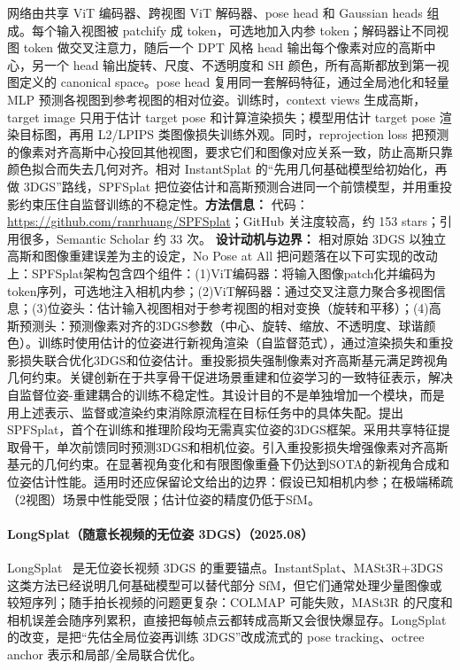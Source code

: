 网络由共享 ViT 编码器、跨视图 ViT 解码器、pose head 和 Gaussian heads 组成。每个输入视图被 patchify 成 token，可选地加入内参 token；解码器让不同视图 token 做交叉注意力，随后一个 DPT 风格 head 输出每个像素对应的高斯中心，另一个 head 输出旋转、尺度、不透明度和 SH 颜色，所有高斯都放到第一视图定义的 canonical space。pose head 复用同一套解码特征，通过全局池化和轻量 MLP 预测各视图到参考视图的相对位姿。训练时，context views 生成高斯，target image 只用于估计 target pose 和计算渲染损失；模型用估计 target pose 渲染目标图，再用 L2/LPIPS 类图像损失训练外观。同时，reprojection loss 把预测的像素对齐高斯中心投回其他视图，要求它们和图像对应关系一致，防止高斯只靠颜色拟合而失去几何对齐。相对 InstantSplat 的“先用几何基础模型给初始化，再做 3DGS”路线，SPFSplat 把位姿估计和高斯预测合进同一个前馈模型，并用重投影约束压住自监督训练的不稳定性。\textbf{方法信息：} 代码：\url{https://github.com/ranrhuang/SPFSplat}；GitHub 关注度较高，约 153 stars；引用很多，Semantic Scholar 约 33 次。
\textbf{设计动机与边界：} 相对原始 3DGS 以独立高斯和图像重建误差为主的设定，No Pose at All 把问题落在以下可实现的改动上：SPFSplat架构包含四个组件：(1)ViT编码器：将输入图像patch化并编码为token序列，可选地注入相机内参；(2)ViT解码器：通过交叉注意力聚合多视图信息；(3)位姿头：估计输入视图相对于参考视图的相对变换（旋转和平移）；(4)高斯预测头：预测像素对齐的3DGS参数（中心、旋转、缩放、不透明度、球谐颜色）。训练时使用估计的位姿进行新视角渲染（自监督范式），通过渲染损失和重投影损失联合优化3DGS和位姿估计。重投影损失强制像素对齐高斯基元满足跨视角几何约束。关键创新在于共享骨干促进场景重建和位姿学习的一致特征表示，解决自监督位姿-重建耦合的训练不稳定性。其设计目的不是单独增加一个模块，而是用上述表示、监督或渲染约束消除原流程在目标任务中的具体失配。提出SPFSplat，首个在训练和推理阶段均无需真实位姿的3DGS框架。采用共享特征提取骨干，单次前馈同时预测3DGS和相机位姿。引入重投影损失增强像素对齐高斯基元的几何约束。在显著视角变化和有限图像重叠下仍达到SOTA的新视角合成和位姿估计性能。适用时还应保留论文给出的边界：假设已知相机内参；在极端稀疏（2视图）场景中性能受限；估计位姿的精度仍低于SfM。
\paragraph{LongSplat（随意长视频的无位姿 3DGS）（2025.08）}
LongSplat~\cite{2508_14041} 是无位姿长视频 3DGS 的重要锚点。InstantSplat、MASt3R+3DGS 这类方法已经说明几何基础模型可以替代部分 SfM，但它们通常处理少量图像或较短序列；随手拍长视频的问题更复杂：COLMAP 可能失败，MASt3R 的尺度和相机误差会随序列累积，直接把每帧点云都转成高斯又会很快爆显存。LongSplat 的改变，是把“先估全局位姿再训练 3DGS”改成流式的 pose tracking、octree anchor 表示和局部/全局联合优化。

